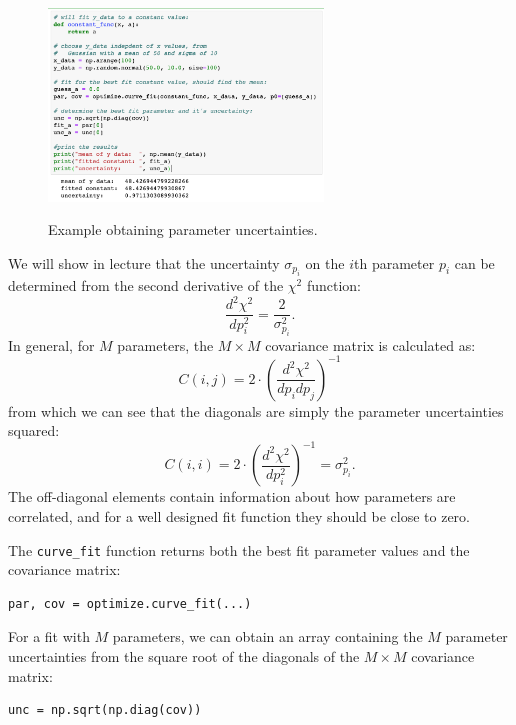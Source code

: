 \begin{figure}[htbp]
\begin{center}
\includegraphics[width=0.65\textwidth]{figs/labs/fitting/uncertainties.png} \\
\caption{Example obtaining parameter uncertainties.}
\label{fig:fitunc}
\end{center}
\end{figure}

We will show in lecture that the uncertainty $\sigma_{p_i}$ on the $i$th parameter $p_i$
can be determined from the second derivative of the $\chi^2$ function:
\begin{displaymath}
\frac{d^2\chi^2}{d p_i^2} = \frac{2}{\sigma_{p_i}^2}.
\end{displaymath}
In general, for $M$ parameters, the $M \times M$ covariance matrix is calculated as:
\begin{displaymath}
C(i,j) = 2 \cdot \left(\dfrac{d^2\chi^2}{d p_i d p_j} \right)^{-1}
\end{displaymath}
from which we can see that the diagonals are simply the parameter uncertainties squared:
\begin{displaymath}
C(i,i) = 2 \cdot \left(\dfrac{d^2\chi^2}{d p_i^2} \right)^{-1} = \sigma^2_{p_i}.
\end{displaymath}
The off-diagonal elements contain information about how parameters are
correlated, and for a well designed fit function they should be close to
zero.

The {\tt curve{\_}fit} function returns both the best fit parameter values and the covariance matrix:
\begin{verbatim}
par, cov = optimize.curve_fit(...)
\end{verbatim}
For a fit with $M$ parameters, we can obtain an array containing the
$M$ parameter uncertainties from the square root of the diagonals of the $M \times M$
covariance matrix:
\begin{verbatim}
unc = np.sqrt(np.diag(cov))
\end{verbatim}

